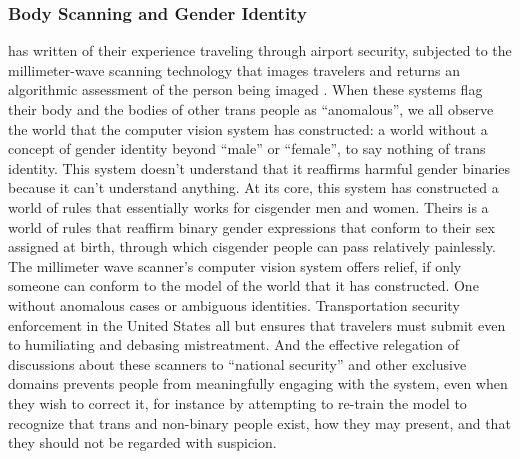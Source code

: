 \documentclass[manuscript,screen]{acmart}
\begin{document}
\subsubsection{Body Scanning and Gender Identity}
\citeauthor{costanza2018design} has written of their experience traveling through airport security, subjected to the millimeter-wave scanning technology that images travelers and returns an algorithmic assessment of the person being imaged
\cite{costanza2018design}.
When these systems flag their body and the bodies of other trans people as ``anomalous'',  we all observe the world that the computer vision system has constructed: a world without a concept of gender identity beyond ``male'' or ``female'', to say nothing of trans identity.
This system doesn't understand that it reaffirms harmful gender binaries because it can't understand anything.
At its core, this system has constructed a world of rules that essentially works for cisgender men and women.
Theirs is a world of rules that reaffirm binary gender expressions that conform to their sex assigned at birth, through which cisgender people can pass relatively painlessly.
The millimeter wave scanner's computer vision system offers relief, if only someone can conform to the model of the world that it has constructed.
One without anomalous cases or ambiguous identities.
Transportation security enforcement in the United States all but ensures that travelers must submit even to humiliating and debasing mistreatment.
And the effective relegation of discussions about these scanners to ``national security'' and other exclusive domains prevents people from meaningfully engaging with the system, even when they wish to correct it, for instance by attempting to re-train the model to recognize that trans and non-binary people exist, how they may present, and that they should not be regarded with suspicion.
\end{document}
